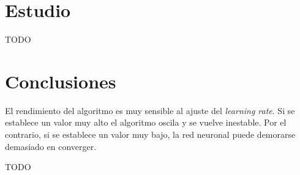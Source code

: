 \documentclass[a4paper,12pt,titlepage]{article}
\begin{document}
\section{Estudio}

TODO

\section{Conclusiones}

El rendimiento del algoritmo es muy sensible al ajuste del \textit{learning rate}. Si se establece un valor muy alto el algoritmo oscila y se vuelve inestable. Por el contrario, si se establece un valor muy bajo, la red neuronal puede demorarse demasiado en converger. 

TODO



\end{document}
